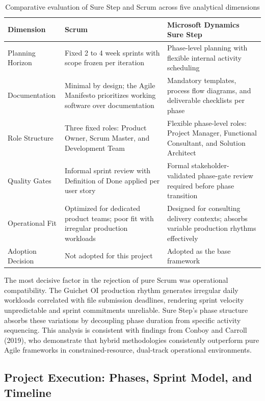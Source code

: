 \begin{table}[H]
  \centering
  \caption{Comparative evaluation of Sure Step and Scrum across five analytical dimensions}
  \renewcommand{\arraystretch}{1.0}
  \begin{tabularx}{\textwidth}{|X|X|X|}
    \hline
    \textbf{Dimension} & \textbf{Scrum} & \textbf{Microsoft Dynamics Sure Step} \\ \hline
    Planning Horizon & Fixed 2 to 4 week sprints with scope frozen per iteration & Phase-level planning with flexible internal activity scheduling \\ \hline
    Documentation & Minimal by design; the Agile Manifesto prioritizes working software over documentation & Mandatory templates, process flow diagrams, and deliverable checklists per phase \\ \hline
    Role Structure & Three fixed roles: Product Owner, Scrum Master, and Development Team & Flexible phase-level roles: Project Manager, Functional Consultant, and Solution Architect \\ \hline
    Quality Gates & Informal sprint review with Definition of Done applied per user story & Formal stakeholder-validated phase-gate review required before phase transition \\ \hline
    Operational Fit & Optimized for dedicated product teams; poor fit with irregular production workloads & Designed for consulting delivery contexts; absorbs variable production rhythms effectively \\ \hline
    Adoption Decision & Not adopted for this project & Adopted as the base framework \\ \hline
  \end{tabularx}
\end{table}

The most decisive factor in the rejection of pure Scrum was operational compatibility. The Guichet OI production rhythm generates irregular daily workloads correlated with file submission deadlines, rendering sprint velocity unpredictable and sprint commitments unreliable. Sure Step's phase structure absorbs these variations by decoupling phase duration from specific activity sequencing. This analysis is consistent with findings from Conboy and Carroll (2019), who demonstrate that hybrid methodologies consistently outperform pure Agile frameworks in constrained-resource, dual-track operational environments.

\subsection{Project Execution: Phases, Sprint Model, and Timeline}

